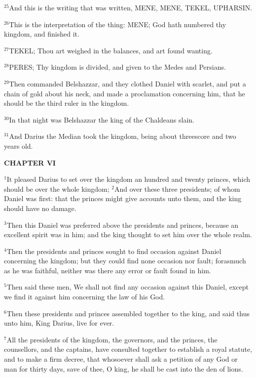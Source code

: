 \documentclass[12pt]{article}
\begin{document}
$^{25}$And this is the writing that was written, MENE, MENE, TEKEL,
UPHARSIN.


$^{26}$This is the interpretation of the thing: MENE; God hath numbered
thy kingdom, and finished it.


$^{27}$TEKEL; Thou art weighed in the balances, and art found wanting.

$^{28}$PERES; Thy kingdom is divided, and given to the Medes and
Persians.


$^{29}$Then commanded Belshazzar, and they clothed Daniel with scarlet,
and put a chain of gold about his neck, and made a proclamation
concerning him, that he should be the third ruler in the kingdom.


$^{30}$In that night was Belshazzar the king of the Chaldeans slain.

$^{31}$And Darius the Median took the kingdom, being about threescore
and two years old.





\begin{center}
\textbf{\small CHAPTER VI}
\end{center}
$^{1}$It pleased Darius to set over the kingdom an hundred and twenty
princes, which should be over the whole kingdom; $^{2}$And over these
three presidents; of whom Daniel was first: that the princes might
give accounts unto them, and the king should have no damage.


$^{3}$Then this Daniel was preferred above the presidents and princes,
because an excellent spirit was in him; and the king thought to set
him over the whole realm.


$^{4}$Then the presidents and princes sought to find occasion against
Daniel concerning the kingdom; but they could find none occasion nor
fault; forasmuch as he was faithful, neither was there any error or
fault found in him.


$^{5}$Then said these men, We shall not find any occasion against this
Daniel, except we find it against him concerning the law of his God.


$^{6}$Then these presidents and princes assembled together to the king,
and said thus unto him, King Darius, live for ever.


$^{7}$All the presidents of the kingdom, the governors, and the princes,
the counsellors, and the captains, have consulted together to
establish a royal statute, and to make a firm decree, that whosoever
shall ask a petition of any God or man for thirty days, save of thee,
O king, he shall be cast into the den of lions.
\end{document}
